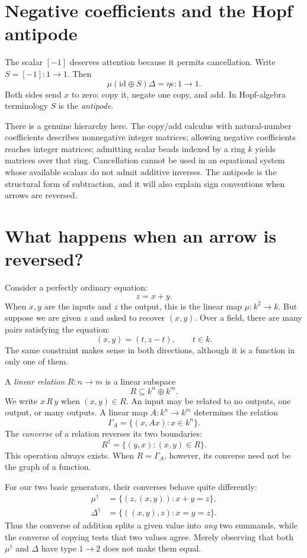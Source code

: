 \section{Negative coefficients and the Hopf antipode}

The scalar \([-1]\) deserves attention because it permits cancellation. Write \(S=[-1]:1\to1\). Then
\[
 \boxed{\mu(\mathrm{id}\oplus S)\Delta
           =\eta\epsilon:1\to1.}
\]
Both sides send \(x\) to zero: copy it, negate one copy, and add. In Hopf-algebra terminology \(S\) is the \emph{antipode}.

There is a genuine hierarchy here. The copy/add calculus with natural-number coefficients describes nonnegative integer matrices; allowing negative coefficients reaches integer matrices; admitting scalar beads indexed by a ring \(k\) yields matrices over that ring. Cancellation cannot be used in an equational system whose available scalars do not admit additive inverses. The antipode is the structural form of subtraction, and it will also explain sign conventions when arrows are reversed.

\section{What happens when an arrow is reversed?}

Consider a perfectly ordinary equation:
\[
 z=x+y.
\]
When \(x,y\) are the inputs and \(z\) the output, this is the linear map
\(\mu:k^2\to k\). But suppose we are given \(z\) and asked to recover \((x,y)\). Over a field, there are many pairs satisfying the equation:
\[
 (x,y)=(t,z-t),\qquad t\in k.
\]
The same constraint makes sense in both directions, although it is a function in only one of them.

A \emph{linear relation} \(R:n\to m\) is a linear subspace
\[
 R\subseteq k^n\oplus k^m.
\]
We write \(x\,R\,y\) when \((x,y)\in R\). An input may be related to no outputs, one output, or many outputs. A linear map \(A:k^n\to k^m\) determines the relation
\[
 \Gamma_A=\{(x,Ax):x\in k^n\}.
\]
The \emph{converse} of a relation reverses its two boundaries:
\[
 R^\dagger=\{(y,x):(x,y)\in R\}.
\]
This operation always exists. When \(R=\Gamma_A\), however, its converse need not be the graph of a function.

For our two basic generators, their converses behave quite differently:
\[
 \begin{aligned}
 \mu^\dagger
 &=\{(z,(x,y)):x+y=z\},\\
 \Delta^\dagger
 &=\{((x,y),z):x=y=z\}.
 \end{aligned}
\]
Thus the converse of addition splits a given value into \emph{any} two summands, while the converse of copying tests that two values agree. Merely observing that both \(\mu^\dagger\) and \(\Delta\) have type \(1\to2\) does not make them equal.

